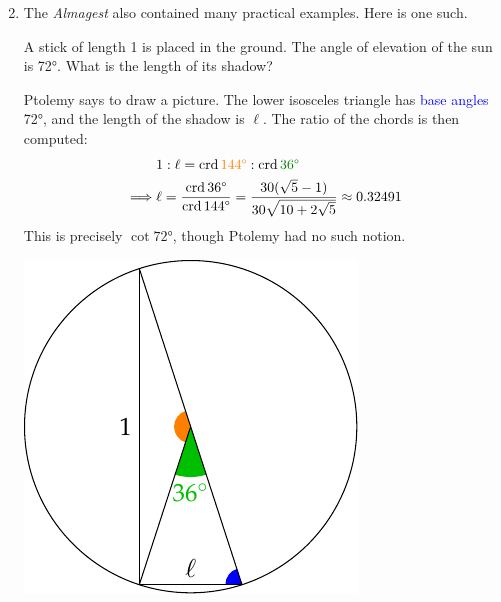 	\begin{enumerate}\setcounter{enumi}{1}
	  \item The \emph{Almagest} also contained many practical examples. Here is one such.\par
		\begin{minipage}[t]{0.65\linewidth}\vspace{-10pt}
			A stick of length 1 is placed in the ground. The angle of elevation of the sun is \ang{72}. What is the length of its shadow?\smallbreak
		
			Ptolemy says to draw a picture. The lower isosceles triangle has \textcolor{blue}{base angles} \ang{72}, and the length of the shadow is $\ell$. The ratio of the chords is then computed:
			\begin{align*}
				&1:\ell=\crd \textcolor{orange}{\ang{144}}:\crd \textcolor{Green}{\ang{36}}\\
				\implies &\ell=\frac{\crd \ang{36}}{\crd \ang{144}}=\frac{30(\sqrt 5-1)}{30\sqrt{10+2\sqrt 5}}\approx 0.32491
			\end{align*}
			This is precisely $\cot \ang{72}$, though Ptolemy had no such notion.
		\end{minipage}
		\hfill
		\begin{minipage}[t]{0.34\linewidth}\vspace{-5pt}
			\flushright\includegraphics[scale=0.85]{trig-anglesun}
		\end{minipage}
	\end{enumerate}







